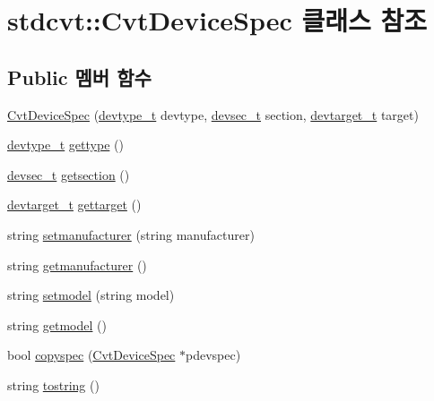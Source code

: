 \hypertarget{classstdcvt_1_1CvtDeviceSpec}{}\section{stdcvt\+:\+:Cvt\+Device\+Spec 클래스 참조}
\label{classstdcvt_1_1CvtDeviceSpec}
\subsection*{Public 멤버 함수}
\begin{DoxyCompactItemize}
\item 
\hyperlink{classstdcvt_1_1CvtDeviceSpec_aa4e65cb8c2c999a88c8c0af4973a3652}{Cvt\+Device\+Spec} (\hyperlink{cvtcode_8h_ae8e34073e35cef0bb47c7fa535fc638b}{devtype\+\_\+t} devtype, \hyperlink{cvtcode_8h_a268eebb73363e24b9e65fd51973bd9c0}{devsec\+\_\+t} section, \hyperlink{cvtcode_8h_a2b37fd5cc4d40c0b8c4b987c271e5ceb}{devtarget\+\_\+t} target)
\item 
\hyperlink{cvtcode_8h_ae8e34073e35cef0bb47c7fa535fc638b}{devtype\+\_\+t} \hyperlink{classstdcvt_1_1CvtDeviceSpec_aebd3553d080f82f7e71d0c145a4e811b}{gettype} ()
\item 
\hyperlink{cvtcode_8h_a268eebb73363e24b9e65fd51973bd9c0}{devsec\+\_\+t} \hyperlink{classstdcvt_1_1CvtDeviceSpec_a1a0224f68343b0ff664492f67b102b02}{getsection} ()
\item 
\hyperlink{cvtcode_8h_a2b37fd5cc4d40c0b8c4b987c271e5ceb}{devtarget\+\_\+t} \hyperlink{classstdcvt_1_1CvtDeviceSpec_acae6e3ba6033ca095b723a541267eab4}{gettarget} ()
\item 
string \hyperlink{classstdcvt_1_1CvtDeviceSpec_a492062d0e23014d77efd75b56d8d21ce}{setmanufacturer} (string manufacturer)
\item 
string \hyperlink{classstdcvt_1_1CvtDeviceSpec_a5aa3ec5557f3a2da7763d13d0da7740c}{getmanufacturer} ()
\item 
string \hyperlink{classstdcvt_1_1CvtDeviceSpec_ad1d1d18f459c2648f325407774f0a44b}{setmodel} (string model)
\item 
string \hyperlink{classstdcvt_1_1CvtDeviceSpec_a9b9a75973c369a9488122848c6a696e8}{getmodel} ()
\item 
bool \hyperlink{classstdcvt_1_1CvtDeviceSpec_a82038a625e1a8705c668ad07a01b5b1f}{copyspec} (\hyperlink{classstdcvt_1_1CvtDeviceSpec}{Cvt\+Device\+Spec} $\ast$pdevspec)
\item 
string \hyperlink{classstdcvt_1_1CvtDeviceSpec_ad3513bc7aad4705052c3ddc4e362294d}{tostring} ()
\end{DoxyCompactItemize}


